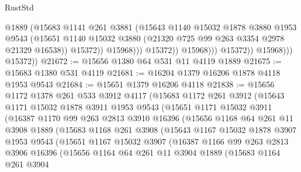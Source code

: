 \begin{lexlean}{RustStd}
\begin{coremodule}
                                  @1889
                                  (@15683
                                    @1141
                                    @261
                                    @3881
                                    (@15643
                                      @1140
                                      @15032
                                      @1878
                                      @3880
                                      @1953
                                      @9543
                                      (@15651
                                        @1140
                                        @15032
                                        @3880
                                        (@21320 @725 @99 @263 @3354 @2978 @21329 @16538))
                                      @15372))
                                  @15968)))
                            @15372))
                        @15968)))
                  @15372))
              @15968)))
        @15372))
@21672 := @15656 @1380 @64 @531 @11 @4119 @1889
@21675 := @15683 @1380 @531 @4119
@21681 := @16204 @1379 @16206 @1878 @4118 @1953 @9543
@21684 := @15651 @1379 @16206 @4118
@21838 := @15656
    @1172
    @1378
    @261
    @533
    @3912
    @4117
    (@15683
      @1172
      @261
      @3912
      (@15643
        @1171
        @15032
        @1878
        @3911
        @1953
        @9543
        (@15651
          @1171
          @15032
          @3911
          (@16387
            @1170
            @99
            @263
            @2813
            @3910
            @16396
            (@15656
              @1168
              @64
              @261
              @11
              @3908
              @1889
              (@15683
                @1168
                @261
                @3908
                (@15643
                  @1167
                  @15032
                  @1878
                  @3907
                  @1953
                  @9543
                  (@15651
                    @1167
                    @15032
                    @3907
                    (@16387
                      @1166
                      @99
                      @263
                      @2813
                      @3906
                      @16396
                      (@15656
                        @1164
                        @64
                        @261
                        @11
                        @3904
                        @1889
                        (@15683
                          @1164
                          @261
                          @3904

\end{coremodule}
\end{lexlean}

